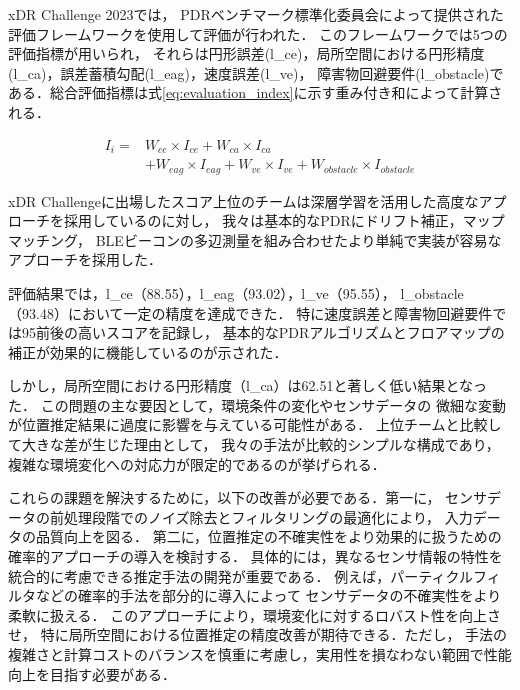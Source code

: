 xDR Challenge 2023では，
PDRベンチマーク標準化委員会によって提供された評価フレームワークを使用して評価が行われた．
このフレームワークでは5つの評価指標が用いられ，
それらは円形誤差(l\_ce)，局所空間における円形精度(l\_ca)，誤差蓄積勾配(l\_eag)，速度誤差(l\_ve)，
障害物回避要件(l\_obstacle)である．総合評価指標は式\ref{eq:evaluation_index}に示す重み付き和によって計算される．

\begin{equation}
	\begin{aligned}
		I_i = & W_{ce} \times I_{ce} + W_{ca} \times I_{ca}                                        \\
		      & + W_{eag} \times I_{eag} + W_{ve} \times I_{ve} + W_{obstacle} \times I_{obstacle}
	\end{aligned}
	\label{eq:evaluation_index}
\end{equation}

xDR Challengeに出場したスコア上位のチームは深層学習を活用した高度なアプローチを採用しているのに対し，
我々は基本的なPDRにドリフト補正，マップマッチング，
BLEビーコンの多辺測量を組み合わせたより単純で実装が容易なアプローチを採用した．

評価結果では，l\_ce（88.55），l\_eag（93.02），l\_ve（95.55），
l\_obstacle（93.48）において一定の精度を達成できた．
特に速度誤差と障害物回避要件では95前後の高いスコアを記録し，
基本的なPDRアルゴリズムとフロアマップの補正が効果的に機能しているのが示された．

しかし，局所空間における円形精度（l\_ca）は62.51と著しく低い結果となった．
この問題の主な要因として，環境条件の変化やセンサデータの
微細な変動が位置推定結果に過度に影響を与えている可能性がある．
上位チームと比較して大きな差が生じた理由として，
我々の手法が比較的シンプルな構成であり，
複雑な環境変化への対応力が限定的であるのが挙げられる．

これらの課題を解決するために，以下の改善が必要である．第一に，
センサデータの前処理段階でのノイズ除去とフィルタリングの最適化により，
入力データの品質向上を図る．
第二に，位置推定の不確実性をより効果的に扱うための確率的アプローチの導入を検討する．
具体的には，異なるセンサ情報の特性を統合的に考慮できる推定手法の開発が重要である．
例えば，パーティクルフィルタなどの確率的手法を部分的に導入によって
センサデータの不確実性をより柔軟に扱える．
このアプローチにより，環境変化に対するロバスト性を向上させ，
特に局所空間における位置推定の精度改善が期待できる．ただし，
手法の複雑さと計算コストのバランスを慎重に考慮し，実用性を損なわない範囲で性能向上を目指す必要がある．

